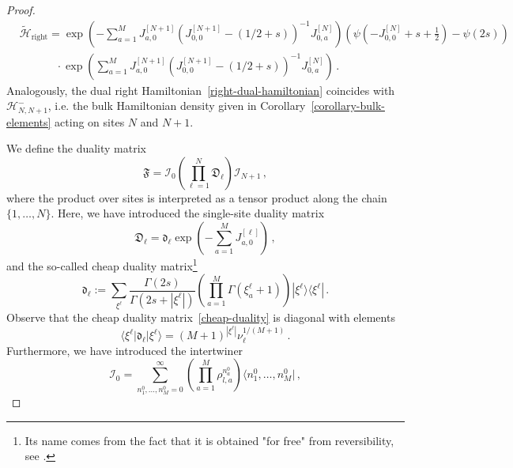\documentclass[11pt]{article}
\numberwithin{equation}{section}
\newcommand{\M}{M}
\newcommand{\N}{N}
\newcommand{\eH}{\mathcal{H}}
\newcommand{\eJ}{J}
\begin{document}
\begin{proof}
\begin{equation}
\begin{split}
        &\widetilde{\eH}_{\text{right}}=\exp{\left(-\sum_{a=1}^{\M}\eJ_{a,0}^{[\N+1]}\left(\eJ_{0,0}^{[\N+1]}-\left(1/2+s\right)\right)^{-1}\eJ_{0,a}^{[\N]}\right)}\left(\psi(-\eJ_{0,0}^{[\N]}+s+\frac{1}{2})-\psi(2s)\right)
			\\&\;\qquad \quad\cdot
			\exp{\left(\sum_{a=1}^{\M}\eJ_{a,0}^{[\N+1]}\left(\eJ_{0,0}^{[\N+1]}-\left(1/2+s\right)\right)^{-1}\eJ_{0,a}^{[\N]}\right)}\,.
            \end{split}
    \end{equation}
    Analogously, the dual right Hamiltonian~\eqref{right-dual-hamiltonian} coincides with $\eH^{-}_{N,N+1}$, i.e. the bulk Hamiltonian density given in Corollary~\ref{corollary-bulk-elements} acting on sites $\N$ and $\N+1$. 
    
	We define the duality matrix
	\begin{equation}\label{duality-matrix}
		\mathfrak{F}=\mathcal{I}_{0}\left(\prod_{\ell=1}^{\N}\mathfrak{D}_{\ell}\right)\mathcal{I}_{\N+1}\,,
	\end{equation}
	where the product over sites is interpreted as a tensor product along the chain $\{1,\ldots, \N\}$. Here, we have introduced the single-site duality matrix 
	\begin{equation}\label{duality-matrix-x}
		\mathfrak{D}_{\ell}=\mathfrak{d}_{\ell}\exp{\left(-\sum_{a=1}^{\M}\eJ_{a,0}^{[\ell]}\right)}\,,
	\end{equation}
	and the so-called cheap duality matrix\footnote{Its name comes from the fact that it is obtained "for free" from reversibility, see \cite{dualityBook}.}
	\begin{equation}\label{cheap-duality}
		\mathfrak{d}_{\ell}:=\sum_{\xi^{\ell}}\frac{\Gamma(2s)}{\Gamma\left(2s+|\xi^{\ell}|\right)}\left(\prod_{a=1}^{\M}\Gamma(\xi_{a}^{\ell}+1)\right)|\xi^{\ell}\rangle \langle \xi^{\ell}|\,.
	\end{equation} 
	Observe that the cheap duality matrix~\eqref{cheap-duality} is diagonal with elements
    \begin{equation}
        \langle \xi^{\ell}|\mathfrak{d}_{\ell}|\xi^{\ell}\rangle = (\M+1)^{|\xi^{\ell}|}\nu_{\ell}^{1/(\M+1)}\,.
    \end{equation}
                        	Furthermore, we have introduced the intertwiner
	\begin{equation}\label{intertwining}
		\mathcal{I}_{0}=\sum_{n_{1}^{0},\ldots,n_{\M}^{0}=0}^{\infty}\left(\prod_{a=1}^{\M}\rho_{l,a}^{n_{a}^{0}}\right)\langle n_{1}^{0},\ldots,n_{\M}^{0}|\,,
	\end{equation}

\end{proof}
\end{document}
